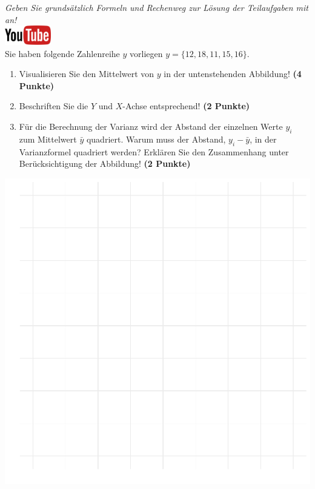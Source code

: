 \documentclass[a4paper, 9pt]{scrartcl}\usepackage[]{graphicx}\usepackage[]{xcolor}
\makeatletter
\def\maxwidth{ %
  \ifdim\Gin@nat@width>\linewidth
    \linewidth
  \else
    \Gin@nat@width
  \fi
}
\makeatother
\begin{document}
\textit{Geben Sie grunds{\"a}tzlich Formeln und Rechenweg zur L{\"o}sung der
  Teilaufgaben mit an!} \\[1Ex]

\hfill\href{https://youtu.be/oMdtYbDInYE}{\includegraphics[width =
  2cm]{img/youtube}}\\[1Ex]

Sie haben folgende Zahlenreihe $y$ vorliegen
$y = \{12, 18, 11, 15, 16\}$.

\begin{enumerate}
\item Visualisieren Sie den Mittelwert von $y$ in der untenstehenden
  Abbildung! \textbf{(4 Punkte)}
\item Beschriften Sie die $Y$ und $X$-Achse entsprechend! \textbf{(2 Punkte)}
\item F{\"u}r die Berechnung der Varianz wird der Abstand der einzelnen Werte $y_i$
  zum Mittelwert $\bar{y}$ quadriert. Warum muss der Abstand, $y_i -
  \bar{y}$, in der Varianzformel quadriert werden?
  Erkl{\"a}ren Sie den Zusammenhang unter Ber{\"u}cksichtigung der Abbildung!
  \textbf{(2 Punkte)}  
\end{enumerate}



{\centering \includegraphics[width=\maxwidth]{img/desc-01-1} 

}
\end{document}
